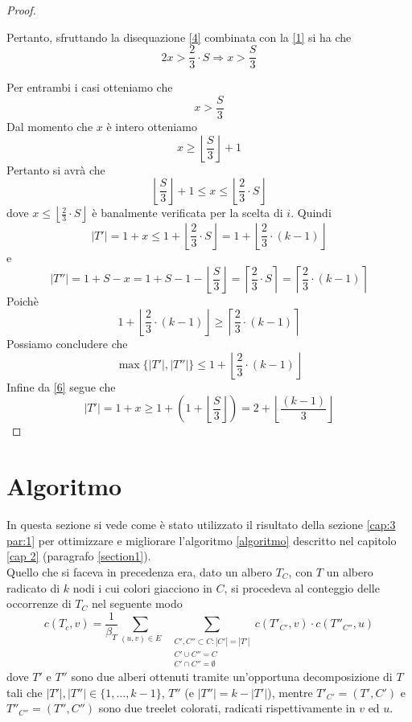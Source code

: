 \begin{proof}
\begin{itemize}
 	Pertanto, sfruttando la disequazione \eqref{4} combinata con la \eqref{1} si ha che
 	\begin{equation}\label{5}
 	2x > \frac{2}{3} \cdot S \Rightarrow x > \frac{S}{3}
 	\end{equation}
	\end{itemize}
Per entrambi i casi otteniamo che 
\[ x > \frac{S}{3} \]
Dal momento che $ x $ \`e intero otteniamo 
\[ x \ge \left\lfloor \frac{S}{3}\right\rfloor  + 1\]
Pertanto si avr\`a che 
\begin{equation}\label{6}
	\left\lfloor \frac{S}{3}\right\rfloor  + 1 \le x \le \left\lfloor \frac{2}{3}\cdot S \right\rfloor
\end{equation} 
dove $  x \le \left\lfloor \frac{2}{3}\cdot S \right\rfloor $ \`e banalmente verificata per la scelta di $ i $.
Quindi 
\begin{equation}\label{7}
|T'| = 1+x \le 1 + \left\lfloor \frac{2}{3}\cdot S \right\rfloor = 1 + \left\lfloor \frac{2}{3} \cdot (k-1) \right\rfloor	
\end{equation}
e
\begin{equation}\label{8}
|T''| = 1 + S - x = 1+S-1 - \left\lfloor \frac{S}{3}\right\rfloor = \left\lceil \frac{2}{3}\cdot S \right\rceil = \left\lceil \frac{2}{3} \cdot (k-1) \right\rceil 	
\end{equation}
Poich\`e
\[1 + \left\lfloor \frac{2}{3} \cdot (k-1) \right\rfloor \ge \left\lceil \frac{2}{3} \cdot (k-1) \right\rceil \] 
Possiamo concludere che
\[ \max\{|T'|,|T''|\} \le 1 + \left\lfloor \frac{2}{3} \cdot (k-1) \right\rfloor \]
Infine da \eqref{6} segue che
\[ 
|T'| = 1+ x \ge 1+ (1 +  \left\lfloor \frac{S}{3}\right\rfloor ) = 2 +  \left\lfloor \frac{(k-1)}{3}\right\rfloor
\]
\end{proof}
 
 	
\section{Algoritmo}
\label{cap:3 par:2}
In questa sezione si vede come \`e stato utilizzato il risultato della sezione \ref{cap:3 par:1} per ottimizzare e migliorare l'algoritmo \ref{algoritmo} descritto nel capitolo \ref{cap 2} (paragrafo \ref{section1}).\\
Quello che si faceva in precedenza era, dato un albero $ T_C $, con $ T $ un albero radicato di $ k $ nodi i cui colori giacciono in $ C $, si procedeva al conteggio delle occorrenze di $ T_C $ nel seguente modo
\[	
c(T_c,v)=\frac{1}{\beta_T}\sum_{(u,v)\in E} \;\; \sum_{\substack{C', C'' \subset C : |C'| = |T'| \\C' \cup C'' = C  \\ C' \cap C'' = \emptyset}}c(T'_{C'},v)\cdot c(T''_{C''},u) 
\]
dove  $T'$ e $T''$ sono due alberi ottenuti tramite un'opportuna decomposizione di $T$  tali che $|T'|, |T''| \in \{1, \dots, k-1\}$, $ T'' $ (e $|T''| = k - |T'|$), mentre $ T'_ {C'} = (T', C') $ e $ T''_{C''} = (T'', C'') $ sono due treelet colorati, radicati rispettivamente in $ v $ ed $ u $.

